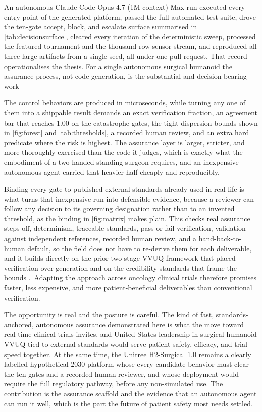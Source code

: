 
An autonomous Claude Code Opus 4.7 (1M context) Max run executed every entry
point of the generated platform, passed the full automated test suite, drove the
ten-gate accept, block, and escalate surface summarised in
\autoref{tab:decisionsurface}, cleared every iteration of the deterministic
sweep, processed the featured tournament and the thousand-row sensor stream, and
reproduced all three large artifacts from a single seed, all under one pull
request. That record operationalises the thesis. For a single autonomous surgical
humanoid the assurance process, not code generation, is the substantial and
decision-bearing work

The control behaviors are produced in microseconds, while
turning any one of them into a shippable result demands an exact verification
fraction, an agreement bar that reaches 1.00 on the catastrophe gates, the tight
dispersion bounds shown in \autoref{fig:forest} and \autoref{tab:thresholds}, a
recorded human review, and an extra hard predicate where the risk is highest. The
assurance layer is larger, stricter, and more thoroughly exercised than the code
it judges, which is exactly what the embodiment of a two-handed standing surgeon
requires, and an inexpensive autonomous agent carried that heavier half cheaply
and reproducibly.

Binding every gate to published external standards already used in real life is
what turns that inexpensive run into defensible evidence, because a reviewer can
follow any decision to its governing designation rather than to an invented
threshold, as the binding in \autoref{fig:matrix} makes plain. This checks real
assurance steps off, determinism, traceable standards, pass-or-fail verification,
validation against independent references, recorded human review, and a
hand-back-to-human default, so the field does not have to re-derive them for each
deliverable, and it builds directly on the prior two-stage VVUQ framework that
placed verification over generation \cite{kawchak2026vvuq01} and on the
credibility standards that frame the bounds \cite{asmevv40, nasastd7009a}.\
Adapting the approach across oncology clinical trials therefore promises faster,
less expensive, and more patient-beneficial deliverables than conventional
verification.

The opportunity is real and the posture is careful. The kind of fast,
standards-anchored, autonomous assurance demonstrated here is what the move toward
real-time clinical trials invites, and United States leadership in
surgical-humanoid VVUQ tied to external standards would serve patient safety,
efficacy, and trial speed together. At the same time, the Unitree H2-Surgical 1.0
remains a clearly labelled hypothetical 2030 platform whose every candidate
behavior must clear the ten gates and a recorded human reviewer, and whose
deployment would require the full regulatory pathway, before any non-simulated
use. The contribution is the assurance scaffold and the evidence that an
autonomous agent can run it well, which is the part the future of patient safety
most needs settled.
